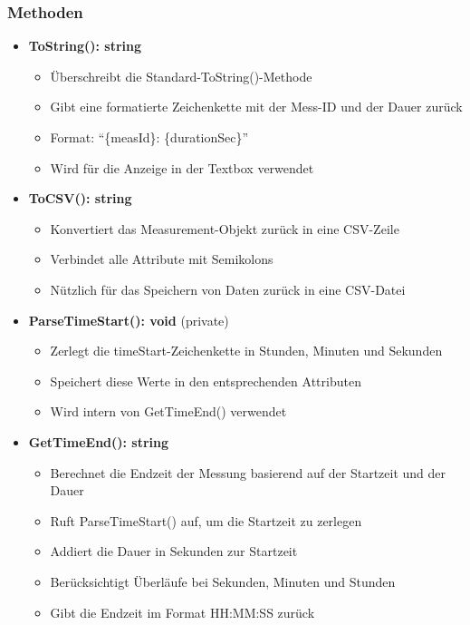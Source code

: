 \documentclass[a4paper,11pt]{article}
\begin{document}
\subsubsection{Methoden}
\begin{itemize}
    \item \textbf{ToString(): string}
    \begin{itemize}
        \item Überschreibt die Standard-ToString()-Methode
        \item Gibt eine formatierte Zeichenkette mit der Mess-ID und der Dauer zurück
        \item Format: ``\{measId\}: \{durationSec\}''
        \item Wird für die Anzeige in der Textbox verwendet
    \end{itemize}
    
    \item \textbf{ToCSV(): string}
    \begin{itemize}
        \item Konvertiert das Measurement-Objekt zurück in eine CSV-Zeile
        \item Verbindet alle Attribute mit Semikolons
        \item Nützlich für das Speichern von Daten zurück in eine CSV-Datei
    \end{itemize}
    
    \item \textbf{ParseTimeStart(): void} (private)
    \begin{itemize}
        \item Zerlegt die timeStart-Zeichenkette in Stunden, Minuten und Sekunden
        \item Speichert diese Werte in den entsprechenden Attributen
        \item Wird intern von GetTimeEnd() verwendet
    \end{itemize}
    
    \item \textbf{GetTimeEnd(): string}
    \begin{itemize}
        \item Berechnet die Endzeit der Messung basierend auf der Startzeit und der Dauer
        \item Ruft ParseTimeStart() auf, um die Startzeit zu zerlegen
        \item Addiert die Dauer in Sekunden zur Startzeit
        \item Berücksichtigt Überläufe bei Sekunden, Minuten und Stunden
        \item Gibt die Endzeit im Format HH:MM:SS zurück
    \end{itemize}
    

\end{itemize}
\end{document}
